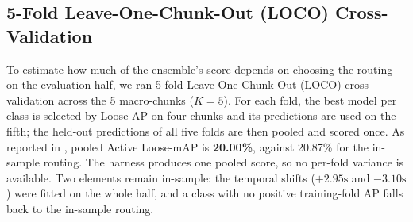 \documentclass[10pt,twocolumn,letterpaper]{article}
\begin{document}
\begin{table}[h]
\centering
\small
\caption{\textbf{Track A Action Spotting on Game~0 Half~1 (45 Mins, 65 Ground-Truth Events). Tight-mAP over 17 classes; Loose-mAP over the 12 active classes; hits within $30\text{s}$. Qwen2.5-VL-7B was run on chunk~0 only (16 events) and returned no parsable output.}}
\label{tab:track_a_benchmark}
\end{table}

\subsection{5-Fold Leave-One-Chunk-Out (LOCO) Cross-Validation}
To estimate how much of the ensemble's score depends on choosing the routing on the evaluation half, we ran 5-fold Leave-One-Chunk-Out (LOCO) cross-validation across the 5 macro-chunks ($K=5$). For each fold, the best model per class is selected by Loose AP on four chunks and its predictions are used on the fifth; the held-out predictions of all five folds are then pooled and scored once. As reported in , pooled Active Loose-mAP is \textbf{20.00\%}, against 20.87\% for the in-sample routing. The harness produces one pooled score, so no per-fold variance is available. Two elements remain in-sample: the temporal shifts ($+2.95\text{s}$ and $-3.10\text{s}$) were fitted on the whole half, and a class with no positive training-fold AP falls back to the in-sample routing.
\end{document}
